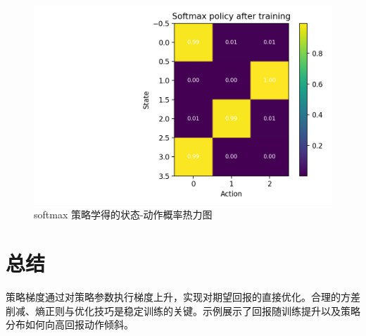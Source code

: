 \documentclass[UTF8,zihao=-4]{ctexart}
\begin{document}
\begin{figure}[H]
  \centering
  \includegraphics[width=0.82\linewidth]{policy_gradient_policy_heatmap.png}
  \caption{softmax 策略学得的状态-动作概率热力图}
  \label{fig:policy_gradient_policy_heatmap_cn}
\end{figure}

\FloatBarrier
\section{总结}
策略梯度通过对策略参数执行梯度上升，实现对期望回报的直接优化。合理的方差削减、熵正则与优化技巧是稳定训练的关键。示例展示了回报随训练提升以及策略分布如何向高回报动作倾斜。
\end{document}
